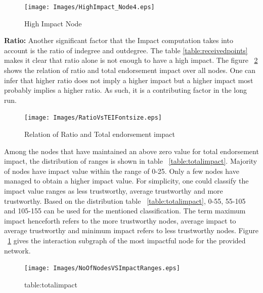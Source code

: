 \begin{figure}
	\texttt{[image: Images/HighImpact\_Node4.eps]}
	\caption{High Impact Node}
	\label{fig:highImpactNode}
\end{figure}

\textbf{Ratio:}
Another significant factor that the Impact computation takes into account is
the ratio of indegree and outdegree. The table \ref{table:receivedpoints} makes
it clear that ratio alone is not enough to have a high impact. The figure
~\ref{fig:ratioimpact} shows the relation of ratio and total endorsement impact
over all nodes. One can infer that higher ratio does not imply a higher impact
but a higher impact most probably implies a higher ratio. As such, it is a
contributing factor in the long run. 

\begin{figure}
	\texttt{[image: Images/RatioVsTEIFontsize.eps]}
	\caption{Relation of Ratio and Total endorsement impact}
	\label{fig:ratioimpact}
\end{figure}
Among the nodes that have maintained an above zero value for total endorsement
impact, the distribution of ranges is shown in table ~\ref{table:totalimpact}.
Majority of nodes have impact value within the range of 0-25. Only a few nodes
have managed to obtain a higher impact value.  For simplicity, one could
classify the impact value ranges as less trustworthy, average trustworthy and
more trustworthy. Based on the distribution table ~\ref{table:totalimpact},
0-55, 55-105 and 105-155 can be used for the mentioned classification. The term
maximum impact henceforth refers to the more trustworthy nodes, average impact
to average trustworthy and minimum impact refers to less trustworthy nodes. 
Figure ~\ref{fig:highImpactNode} gives the interaction subgraph of the most
impactful node for the provided network.
\begin{figure}
	\texttt{[image: Images/NoOfNodesVSImpactRanges.eps]}
	\caption{table:totalimpact}
	\label{}
\end{figure}

